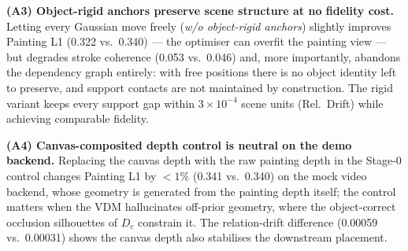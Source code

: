 \textbf{(A3) Object-rigid anchors preserve scene structure at no fidelity
cost.} Letting every Gaussian move freely (\emph{w/o object-rigid anchors})
slightly improves Painting L1 (0.322 vs.\ 0.340) --- the optimiser can
overfit the painting view --- but degrades stroke coherence (0.053 vs.\
0.046) and, more importantly, abandons the dependency graph entirely: with
free positions there is no object identity left to preserve, and support
contacts are not maintained by construction. The rigid variant keeps every
support gap within $3\times10^{-4}$ scene units (Rel.\ Drift) while
achieving comparable fidelity.

\textbf{(A4) Canvas-composited depth control is neutral on the demo
backend.} Replacing the canvas depth with the raw painting depth in the
Stage-0 control changes Painting L1 by $<1\%$ (0.341 vs.\ 0.340) on the
mock video backend, whose geometry is generated from the painting depth
itself; the control matters when the VDM hallucinates off-prior geometry,
where the object-correct occlusion silhouettes of $D_c$ constrain it. The
relation-drift difference (0.00059 vs.\ 0.00031) shows the canvas depth
also stabilises the downstream placement.

